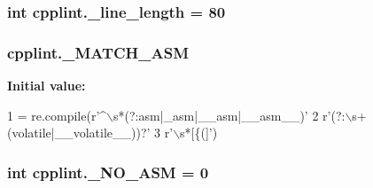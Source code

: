 \subsubsection[{\texorpdfstring{\+\_\+line\+\_\+length}{_line_length}}]{\setlength{\rightskip}{0pt plus 5cm}int cpplint.\+\_\+line\+\_\+length = 80\hspace{0.3cm}{\ttfamily [private]}}\hypertarget{namespacecpplint_ab59a11cdee470ff44dae2c9a3cf1fa22}{}\label{namespacecpplint_ab59a11cdee470ff44dae2c9a3cf1fa22}
\subsubsection[{\texorpdfstring{\+\_\+\+M\+A\+T\+C\+H\+\_\+\+A\+SM}{_MATCH_ASM}}]{\setlength{\rightskip}{0pt plus 5cm}cpplint.\+\_\+\+M\+A\+T\+C\+H\+\_\+\+A\+SM\hspace{0.3cm}{\ttfamily [private]}}\hypertarget{namespacecpplint_a06e1a7cd329c1216de85c4524dbbb21c}{}\label{namespacecpplint_a06e1a7cd329c1216de85c4524dbbb21c}
{\bfseries Initial value\+:}
\begin{DoxyCode}
1 = re.compile(\textcolor{stringliteral}{r'^\(\backslash\)s*(?:asm|\_asm|\_\_asm|\_\_asm\_\_)'}
2                         \textcolor{stringliteral}{r'(?:\(\backslash\)s+(volatile|\_\_volatile\_\_))?'}
3                         \textcolor{stringliteral}{r'\(\backslash\)s*[\{(]'})
\end{DoxyCode}
\subsubsection[{\texorpdfstring{\+\_\+\+N\+O\+\_\+\+A\+SM}{_NO_ASM}}]{\setlength{\rightskip}{0pt plus 5cm}int cpplint.\+\_\+\+N\+O\+\_\+\+A\+SM = 0\hspace{0.3cm}{\ttfamily [private]}}\hypertarget{namespacecpplint_a03d7f3e1fb21e3da0a3c4ae1ca9f771a}{}\label{namespacecpplint_a03d7f3e1fb21e3da0a3c4ae1ca9f771a}
